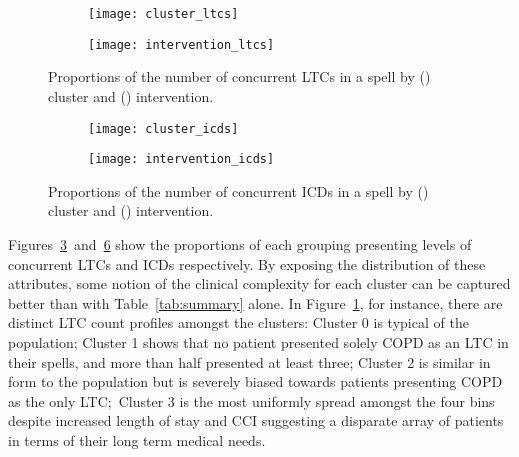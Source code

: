 \begin{figure}
    \centering
    \begin{subfigure}{.5\imgwidth}
        \texttt{[image: cluster\_ltcs]}
        \caption{}\label{fig:cluster_ltcs}
    \end{subfigure}\hfill%
    \begin{subfigure}{.5\imgwidth}
        \texttt{[image: intervention\_ltcs]}
        \caption{}\label{fig:intervention_ltcs}
    \end{subfigure}
    \caption{%
        Proportions of the number of concurrent LTCs in a spell by
        () cluster and ()
        intervention.
    }\label{fig:ltcs}
\end{figure}

\begin{figure}
    \centering
    \begin{subfigure}{.5\imgwidth}
        \texttt{[image: cluster\_icds]}
        \caption{}\label{fig:cluster_icds}
    \end{subfigure}\hfill%
    \begin{subfigure}{.5\imgwidth}
        \texttt{[image: intervention\_icds]}
        \caption{}\label{fig:intervention_icds}
    \end{subfigure}
    \caption{%
        Proportions of the number of concurrent ICDs in a spell by
        () cluster and ()
        intervention.
    }\label{fig:icds}
\end{figure}

Figures~\ref{fig:ltcs}~and~\ref{fig:icds} show the proportions of each grouping
presenting levels of concurrent LTCs and ICDs respectively. By exposing the
distribution of these attributes, some notion of the clinical complexity for
each cluster can be captured better than with Table~\ref{tab:summary} alone. In
Figure~\ref{fig:cluster_ltcs}, for instance, there are distinct LTC count
profiles amongst the clusters: Cluster 0 is typical of the population; Cluster 1
shows that no patient presented solely COPD as an LTC in their spells, and more
than half presented at least three; Cluster 2 is similar in form to the
population but is severely biased towards patients presenting COPD as the only
LTC;\ Cluster 3 is the most uniformly spread amongst the four bins despite
increased length of stay and CCI suggesting a disparate array of patients in
terms of their long term medical needs.

